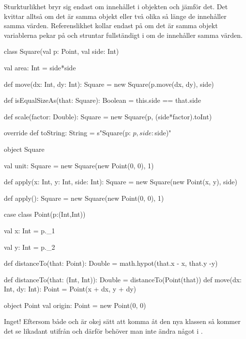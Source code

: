 \Subtask Sturkturlikhet bryr sig endast om innehållet i objekten och jämför det. Det kvittar alltså om det är samma objekt eller två olika så länge de innehåller samma värden. Referenslikhet kollar endast på om det är samma objekt variablerna pekar på och struntar fullständigt i om de innehåller samma värden.

\Task \begin{CodeSmall}
class Square(val p: Point, val side: Int) {
	val area: Int = side*side

	def move(dx: Int, dy: Int): Square = new Square(p.move(dx, dy), side)

	def isEqualSizeAs(that: Square): Boolean = this.side == that.side

	def scale(factor: Double): Square = new Square(p, (side*factor).toInt)

	override def toString: String = s"Square(p: $p, side: $side)"
}

object Square {
	val unit: Square = new Square(new Point(0, 0), 1)

	def apply(x: Int, y: Int, side: Int): Square =
		new Square(new Point(x, y), side)

	def apply(): Square = new Square(new Point(0, 0), 1)
}
\end{CodeSmall}

\Task  \begin{CodeSmall}
case class Point(p:(Int,Int)) {
	val x: Int = p._1

	val y: Int = p._2

	def distanceTo(that: Point): Double = math.hypot(that.x - x, that.y -y)

	def distanceTo(that: (Int, Int)): Double = distanceTo(Point(that))
	def move(dx: Int, dy: Int): Point = Point(x + dx, y + dy)
}

object Point {
	val origin: Point = new Point(0, 0)
}
\end{CodeSmall}

\Task Inget! Eftersom både  och  är okej sätt att komma åt den nya klassen så kommer det se likadant utifrån och därför behöver man inte ändra något i .

\Task %

